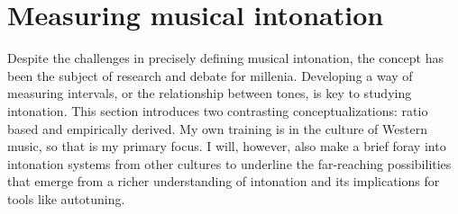 \section{Measuring musical intonation}
\label{sec:ratio}
Despite the challenges in precisely defining musical intonation, the concept has been the subject of research and debate for millenia. Developing a way of measuring intervals, or the relationship between tones, is key to studying intonation. This section introduces two contrasting conceptualizations: ratio based and empirically derived. My own training is in the culture of Western music, so that is my primary focus. I will, however, also make a brief foray into intonation systems from other cultures to underline the far-reaching possibilities that emerge from a richer understanding of intonation and its implications for tools like autotuning.

